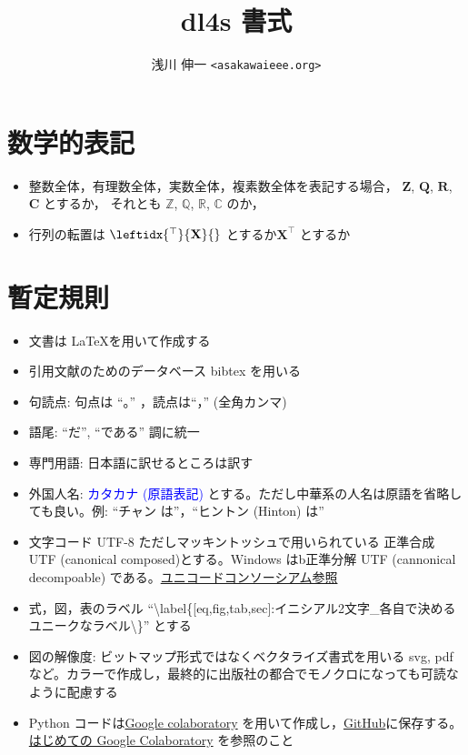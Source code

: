 ﻿\documentclass[uplatex,10pt,a4paper]{jsarticle}
\title{dl4s 書式}
\author{浅川 伸一 {\tt<asakawa\symbol{64}ieee.org>}}
\date{}
\newcommand{\mb}[1]{\mathbf{#1}}
\newcommand{\strong}[1]{\textcolor{blue}{#1}}
\begin{document}
\maketitle

\section{数学的表記}
\begin{itemize}
\item 整数全体，有理数全体，実数全体，複素数全体を表記する場合，
$\mb{Z}$, $\mb{Q}$, $\mb{R}$, $\mb{C}$ とするか，
それとも
$\mathbb{Z}$, $\mathbb{Q}$, $\mathbb{R}$, $\mathbb{C}$
のか，
\item 行列の転置は $\leftidx{^\top}{\mb{X}}{}$ とするか$\mb{X}^{\top}$ とするか
\end{itemize}

\section{暫定規則}

\begin{itemize}
\item 文書は \LaTeX を用いて作成する
\item 引用文献のためのデータベース bibtex を用いる
\item 句読点: 句点は ``。'' ，読点は``，'' (全角カンマ)
\item 語尾: ``だ'', ``である'' 調に統一
\item 専門用語: 日本語に訳せるところは訳す
\item 外国人名: \strong{カタカナ (原語表記)} とする。ただし中華系の人名は原語を省略しても良い。例: ``チャン は''，``ヒントン (Hinton) は''
\item 文字コード UTF-8 ただしマッキントッシュで用いられている 正準合成 UTF (canonical composed)とする。Windows はb正準分解 UTF (cannonical decompoable) である。\href{http://unicode.org/reports/tr15/}{ユニコードコンソーシアム参照}
\item 式，図，表のラベル ``\textbackslash label\{[eq,fig,tab,sec]:イニシアル2文字\_各自で決めるユニークなラベル\textbackslash\}'' とする
\item 図の解像度: ビットマップ形式ではなくベクタライズ書式を用いる svg, pdf など。カラーで作成し，最終的に出版社の都合でモノクロになっても可読なように配慮する
\item Python コードは\href{https://colab.research.google.com/notebooks/welcome.ipynb?hl=ja}{Google colaboratory} %
  を用いて作成し，\href{https://github.com/ShinAsakawa/2019dl4s}{GitHub}に保存する。
\href{https://github.com/ShinAsakawa/2019dl4s/blob/master/2019dl4s_first_colaboratory.ipynb}{はじめての Google Colaboratory} を参照のこと
\end{itemize}
\end{document}
